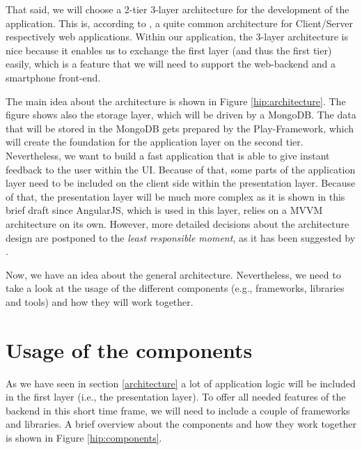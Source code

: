 That said, we will choose a 2-tier 3-layer architecture for the development of the application. This is, according to \cite{Eckerson1995}, a quite common architecture for Client/Server respectively web applications. Within our application, the 3-layer architecture is nice because it enables us to exchange the first layer (and thus the first tier) easily, which is a feature that we will need to support the web-backend and a smartphone front-end. 

The main idea about the architecture is shown in Figure \ref{hip:architecture}. The figure shows also the storage layer, which will be driven by a MongoDB. The data that will be stored in the MongoDB gets prepared by the Play-Framework, which will create the foundation for the application layer on the second tier. Nevertheless, we want to build a fast  application that is able to give instant feedback to the user within the \ac{UI}. Because of that, some parts of the application layer need to be included on the client side within the presentation layer. Because of that, the presentation layer will be much more complex as it is shown in this brief draft since AngularJS, which is used in this layer, relies on a \ac{MVVM} architecture on its own.
However, more detailed decisions about the architecture design are postponed to the \textit{least responsible moment}, as it has been suggested by \cite{Mast2013}.

Now, we have an idea about the general architecture. Nevertheless, we need to take a look at the usage of the different components (e.g., frameworks, libraries and tools) and how they will work together.

\section{Usage of the components}
As we have seen in section \ref{architecture} a lot of application logic will be included in the first layer (i.e., the presentation layer). To offer all needed features of the backend in this short time frame, we will need to include a couple of frameworks and libraries. A brief overview about the components and how they work together is shown in Figure \ref{hip:components}. 

